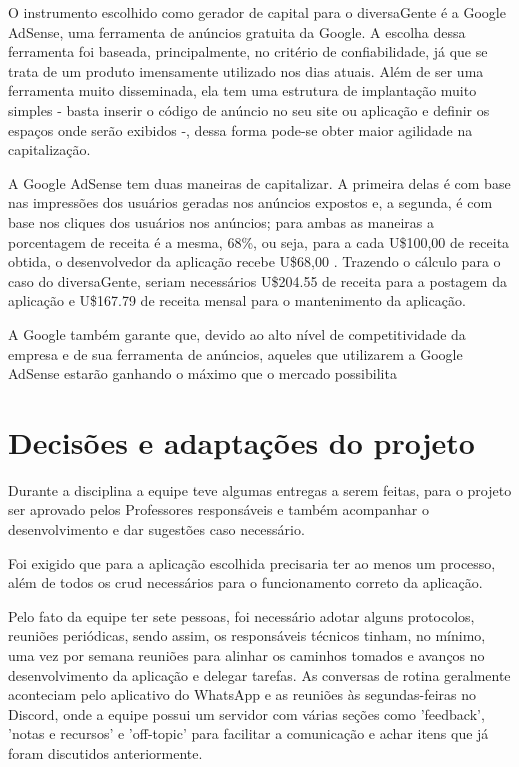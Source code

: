 O instrumento escolhido como gerador de capital para o diversaGente é a Google AdSense, uma ferramenta de anúncios gratuita da Google. A escolha dessa ferramenta foi baseada, principalmente, no critério de confiabilidade, já que se trata de um produto imensamente utilizado nos dias atuais. Além de ser uma ferramenta muito disseminada, ela tem uma estrutura de implantação muito simples - basta inserir o código de anúncio no seu site ou aplicação e definir os espaços onde serão exibidos -, dessa forma pode-se obter maior agilidade na capitalização.




A Google AdSense tem duas maneiras de capitalizar. A primeira delas é com base nas impressões dos usuários geradas nos anúncios expostos e, a segunda, é com base nos cliques dos usuários nos anúncios; para ambas as maneiras a porcentagem de receita é a mesma, 68\%, ou seja, para a cada U\$100,00 de receita obtida, o desenvolvedor da aplicação recebe U\$68,00  \cite{googleadsense}. Trazendo o cálculo para o caso do diversaGente, seriam necessários U\$204.55 de receita para a postagem da aplicação e U\$167.79 de receita mensal para o mantenimento da aplicação.

A Google também garante que, devido ao alto nível de competitividade da empresa e de sua ferramenta de anúncios, aqueles que utilizarem a Google AdSense estarão ganhando o máximo que o mercado possibilita


\section{Decisões e adaptações do projeto}

Durante a disciplina a equipe teve algumas entregas a serem feitas, para o projeto ser aprovado pelos Professores responsáveis e também acompanhar o desenvolvimento e dar sugestões caso necessário. 

Foi exigido que para a aplicação escolhida precisaria ter ao menos um processo, além de todos os \ac{crud} necessários para o funcionamento correto da aplicação.

Pelo fato da equipe ter sete pessoas, foi necessário adotar alguns protocolos, reuniões periódicas, sendo assim, os responsáveis técnicos tinham, no mínimo, uma vez por semana reuniões para alinhar os caminhos tomados e avanços no desenvolvimento da aplicação e delegar tarefas. As conversas de rotina geralmente aconteciam pelo aplicativo do WhatsApp e as reuniões às segundas-feiras no Discord, onde a equipe possui um servidor com várias seções como 'feedback', 'notas e recursos' e 'off-topic' para facilitar a comunicação e achar itens que já foram discutidos anteriormente.

